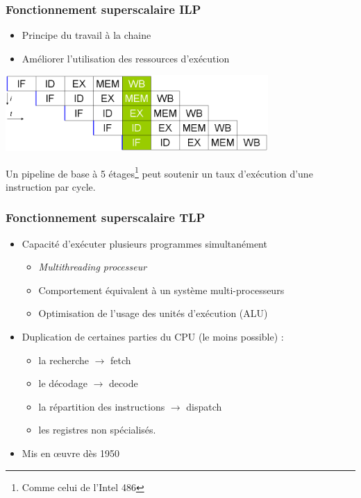 \begin{frame}
\frametitle{Fonctionnement superscalaire ILP}
\begin{itemize}
\item Principe du travail à la chaine
\item Améliorer l'utilisation des ressources d'exécution
\end{itemize}
\includegraphics[width=10cm]{../illustration/processeur-ILP.png}

Un pipeline de base à 5 étages\footnote{Comme celui de l'Intel 486} peut soutenir un taux d'exécution d'une instruction par cycle. \cite{wp-cpu}
\end{frame}

\begin{frame}
\frametitle{Fonctionnement superscalaire TLP}
\begin{itemize}
\item Capacité d'exécuter plusieurs programmes simultanément
\begin{itemize}
\item \textit{Multithreading processeur}
\item Comportement équivalent à un système multi-processeurs
\item Optimisation de l'usage des unités d'exécution (ALU)
\end{itemize}
\item Duplication de certaines parties du CPU (le moins possible) :
\begin{itemize}
\item la recherche $\rightarrow$ fetch
\item le décodage $\rightarrow$ decode
\item la répartition des instructions $\rightarrow$ dispatch
\item les registres non spécialisés.
\end{itemize}
\item Mis en œuvre dès 1950
\end{itemize}
\end{frame}

